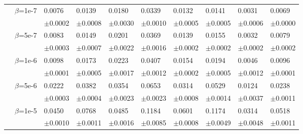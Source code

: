 \documentclass{article}
\begin{document}
\begin{table}[h!]
{\begin{tabularx}{\textwidth}{ccX X X X X X X X}
        & \multirow{2}{*}{$\beta$=1e-7}
        & 0.0076 & 0.0139 & 0.0180 & 0.0339 & 0.0132 & 0.0141 & 0.0031 & 0.0069\\
        &&\scriptsize$\pm$0.0002 & \scriptsize $\pm$0.0008 & \scriptsize $\pm$0.0030 & \scriptsize $\pm$0.0010 & \scriptsize $\pm$0.0005 & \scriptsize $\pm$0.0005 & \scriptsize $\pm$0.0006 & \scriptsize $\pm$0.0000\\
        \cline{3-10}\rule{0pt}{2.3ex}

        & \multirow{2}{*}{$\beta$=5e-7}
        & 0.0083 & 0.0149 & 0.0201 & 0.0369 & 0.0139 & 0.0155 & 0.0032 & 0.0079\\
        &&\scriptsize$\pm$0.0003 & \scriptsize $\pm$0.0007 & \scriptsize $\pm$0.0022 & \scriptsize $\pm$0.0016 & \scriptsize $\pm$0.0002 & \scriptsize $\pm$0.0002 & \scriptsize $\pm$0.0002 & \scriptsize $\pm$0.0002\\
        \cline{3-10}\rule{0pt}{2.3ex}

        & \multirow{2}{*}{$\beta$=1e-6}
        & 0.0098 & 0.0173 & 0.0223 & 0.0407 & 0.0154 & 0.0194 & 0.0046 & 0.0096\\
        &&\scriptsize$\pm$0.0001 & \scriptsize $\pm$0.0005 & \scriptsize $\pm$0.0017 & \scriptsize $\pm$0.0012 & \scriptsize $\pm$0.0002 & \scriptsize $\pm$0.0005 & \scriptsize $\pm$0.0012 & \scriptsize $\pm$0.0001\\
        \cline{3-10}\rule{0pt}{2.3ex}

        & \multirow{2}{*}{$\beta$=5e-6}
        & 0.0222 & 0.0382 & 0.0354 & 0.0653 & 0.0314 & 0.0529 & 0.0124 & 0.0238\\
        &&\scriptsize$\pm$0.0003 & \scriptsize $\pm$0.0004 & \scriptsize $\pm$0.0023 & \scriptsize $\pm$0.0023 & \scriptsize $\pm$0.0008 & \scriptsize $\pm$0.0014 & \scriptsize $\pm$0.0037 & \scriptsize $\pm$0.0011\\

        \cline{3-10}\rule{0pt}{2.3ex}

        & \multirow{2}{*}{$\beta$=1e-5}
        & 0.0450 & 0.0768 & 0.0485 & 0.1184 & 0.0601 & 0.1174 & 0.0314 & 0.0518\\
        &&\scriptsize$\pm$0.0010 & \scriptsize $\pm$0.0011 & \scriptsize $\pm$0.0016 & \scriptsize $\pm$0.0085 & \scriptsize $\pm$0.0008 & \scriptsize $\pm$0.0049 & \scriptsize $\pm$0.0048 & \scriptsize $\pm$0.0011\\

      \bottomrule
\end{tabularx}
}
\end{table}
\clearpage
\end{document}

